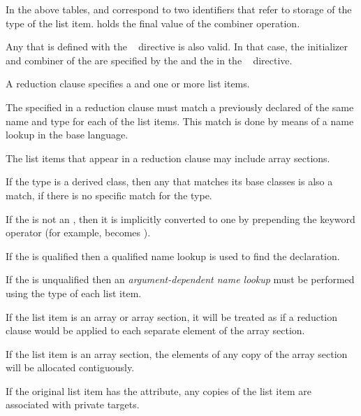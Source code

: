 In the above tables,  and  correspond to two
identifiers that refer to storage of the type of the list item. 
holds the final value of the combiner operation.

Any  that is defined with the ~
directive is also valid. In that case, the initializer and combiner of the
 are specified by the  and
the  in the ~ directive.

\descr
A reduction clause specifies a  and one or more list
items.

The  specified in a reduction clause must match a
previously declared  of the same name and type for
each of the list items. This match is done by means of a name lookup in the
base language.

The list items that appear in a reduction clause may include array sections.

\begin{cppspecific}
If the type is a derived class, then any  that matches 
its base classes is also a match, if there is no specific match for the type.

If the  is not an , then it is
implicitly converted to one by prepending the keyword operator (for example,
\code{+} becomes {\code{+}}).

If the  is qualified then a qualified name lookup is
used to find the declaration.

If the  is unqualified then an 
\emph{argument-dependent name lookup} must be performed using the 
type of each list item.
\end{cppspecific}

If the list item is an array or array section, it will be treated as
if a reduction clause would be applied to each separate element
of the array section.

If the list item is an array section, the elements of any copy of the 
array section will be allocated contiguously.

\begin{samepage}
\begin{fortranspecific}
If the original list item has the  attribute, any copies of
the list item are associated with private targets.
\end{fortranspecific}
\end{samepage}

